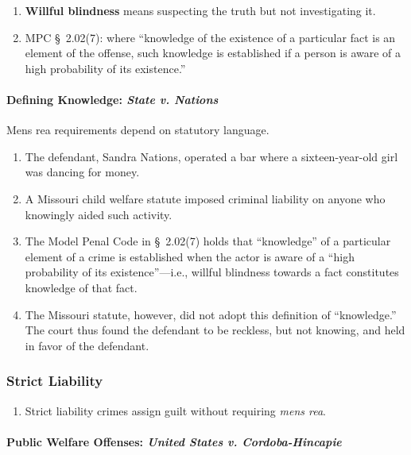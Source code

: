 \begin{enumerate}
    \item \textbf{Willful blindness} means suspecting the truth but not 
    investigating it.
    \item MPC \S\ 2.02(7): where ``knowledge of the existence of a particular 
    fact is an element of the offense, such knowledge is established if a 
    person is aware of a high probability of its existence.''
\end{enumerate}

\paragraph{Defining Knowledge: \emph{State v. Nations}}

Mens rea requirements depend on statutory language.

\begin{enumerate}
    \item The defendant, Sandra Nations, operated a bar where a 
    sixteen-year-old girl was dancing for money.
    \item A Missouri child welfare statute imposed criminal liability on 
    anyone who knowingly aided such activity.
    \item The Model Penal Code in \S\ 2.02(7) holds that ``knowledge'' of a 
    particular element of a crime is established when the actor is aware of a 
    ``high probability of its existence''---i.e., willful blindness towards a 
    fact constitutes knowledge of that fact.
    \item The Missouri statute, however, did not adopt this definition of 
    ``knowledge.'' The court thus found the defendant to be reckless, but not 
    knowing, and held in favor of the defendant.
\end{enumerate}

\subsubsection{Strict Liability}

\begin{enumerate}
    \item Strict liability crimes assign guilt without requiring \emph{mens 
    rea}.
\end{enumerate}

\paragraph{Public Welfare Offenses: \emph{United States v. Cordoba-Hincapie}}

